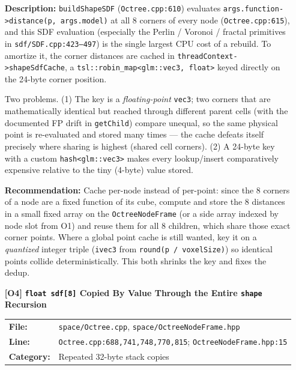\documentclass[a4paper,12pt]{article}
\newcommand{\severitybox}[2]{%
  \colorbox{#1}{\makebox[2.5cm][c]{\textcolor{white}{\textbf{#2}}}}%
}
\begin{document}
\begin{enumerate}[leftmargin=*]
  \textbf{Description:}
  \texttt{buildShapeSDF} (\texttt{Octree.cpp:610}) evaluates
  \texttt{args.function->distance(p, args.model)} at all 8 corners of every node
  (\texttt{Octree.cpp:615}), and this SDF evaluation (especially the Perlin /
  Voronoi / fractal primitives in \texttt{sdf/SDF.cpp:423--497}) is the single
  largest CPU cost of a rebuild. To amortize it, the corner distances are cached in
  \texttt{threadContext->shapeSdfCache}, a \texttt{tsl::robin\_map<glm::vec3,
  float>} keyed directly on the 24-byte corner position.

  Two problems. (1) The key is a \emph{floating-point} \texttt{vec3}; two corners
  that are mathematically identical but reached through different parent cells
  (with the documented FP drift in \texttt{getChild}) compare unequal, so the same
  physical point is re-evaluated and stored many times — the cache defeats itself
  precisely where sharing is highest (shared cell corners). (2) A 24-byte key with
  a custom \texttt{hash<glm::vec3>} makes every lookup/insert comparatively
  expensive relative to the tiny (4-byte) value stored.

  \textbf{Recommendation:}
  Cache per-node instead of per-point: since the 8 corners of a node are a fixed
  function of its cube, compute and store the 8 distances in a small fixed array on
  the \texttt{OctreeNodeFrame} (or a side array indexed by node slot from O1) and
  reuse them for all 8 children, which share those exact corner points. Where a
  global point cache is still wanted, key it on a \emph{quantized} integer triple
  (\texttt{ivec3} from \texttt{round(p / voxelSize)}) so identical points collide
  deterministically. This both shrinks the key and fixes the dedup.

\item[\textbf{[O4]}] \textbf{\texttt{float sdf[8]} Copied By Value Through the Entire \texttt{shape} Recursion}
  \hfill \severitybox{mediumcolor}{MEDIUM}

  \begin{tabular}{ll}
    \textbf{File:} & \texttt{space/Octree.cpp}, \texttt{space/OctreeNodeFrame.hpp} \\
    \textbf{Line:} & \texttt{Octree.cpp:688,741,748,770,815};
                      \texttt{OctreeNodeFrame.hpp:15} \\
    \textbf{Category:} & Repeated 32-byte stack copies \\
  \end{tabular}


\end{enumerate}
\end{document}
